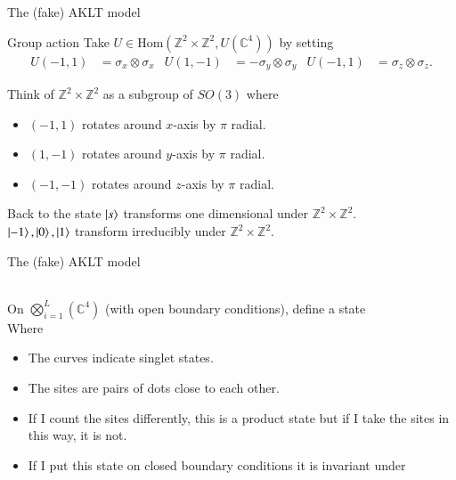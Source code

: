 \documentclass{beamer}
\newcommand{\CC}{\mathbb{C}}
\newcommand{\ZZ}{\mathbb{Z}}
\begin{document}
\begin{frame}{The (fake) AKLT model}
	\begin{block}{Group action}
		Take $U\in \textrm{Hom}(\ZZ^2\times \ZZ^2,U(\CC^4))$ by setting
		\begin{align*}
		U(-1,1)&=\sigma_x\otimes \sigma_x&U(1,-1)&=-\sigma_y\otimes \sigma_y&U(-1,1)&=\sigma_z\otimes \sigma_z.
		\end{align*}
	\end{block}
	Think of $\ZZ^2\times \ZZ^2$ as a subgroup of $SO(3)$ where
	\begin{itemize}
		\item $(-1,1)$ rotates around $x$-axis by $\pi$ radial.
		\item $(1,-1)$ rotates around $y$-axis by $\pi$ radial.
		\item $(-1,-1)$ rotates around $z$-axis by $\pi$ radial.
	\end{itemize}
	\pause
	\begin{block}{Back to the state}
		$\ket{s}$ transforms one dimensional under $\ZZ^2\times \ZZ^2$.\\
		$\ket{-1},\ket{0},\ket{1}$ transform irreducibly under $\ZZ^2\times \ZZ^2$.
	\end{block}
\end{frame}

\begin{frame}{The (fake) AKLT model}
	\\
	On $\bigotimes_{i=1}^L(\CC^4)$ (with open boundary conditions), define a state\\
	Where\\
	\begin{itemize}
		\item The curves indicate singlet states.
		\item The sites are pairs of dots close to each other.
		\item If I count the sites differently, this is a product state but if I take the sites in this way, it is not.
		\item If I put this state on closed boundary conditions it is invariant under 
	\end{itemize}
\end{frame}
\end{document}

